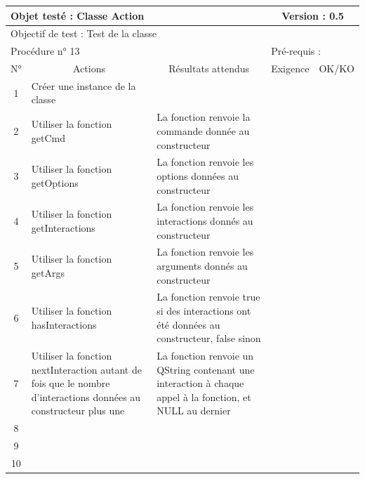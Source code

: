 \documentclass{../res/univ-projet}
\begin{document}
\begin{center}
	
    \begin{tabular}{|c|p{5cm}|p{5cm}|p{1.5cm}|p{1.5cm}|}
      \hline
      \multicolumn{3}{|l|}{Objet testé : Classe Action} & \multicolumn{2}{c|}{Version : 0.5}\\ \hline
      \multicolumn{5}{|l|}{Objectif de test : Test de la classe}\\ \hline
      \multicolumn{3}{|l|}{Procédure n° 13} & \multicolumn{2}{p{3cm}|}{Pré-requis : }\\ \hline
      \multicolumn{1}{|c|}{N°} & \multicolumn{1}{c|}{Actions} & \multicolumn{1}{c|}{Résultats attendus} & 
      \multicolumn{1}{c|}{Exigence} & \multicolumn{1}{c|}{OK/KO}\\ \hline
      1 & Créer une instance de la classe &  &  & \\
      2 & Utiliser la fonction getCmd & La fonction renvoie la commande donnée au constructeur &  & \\
      3 & Utiliser la fonction getOptions & La fonction renvoie les options données au constructeur &  & \\
      4 & Utiliser la fonction getInteractions & La fonction renvoie les interactions donnés au constructeur &  & \\
      5 & Utiliser la fonction getArgs & La fonction renvoie les arguments donnés au constructeur &  & \\
	  6 & Utiliser la fonction hasInteractions & La fonction renvoie true si des interactions ont été données au constructeur, false sinon &  & \\
      7 & Utiliser la fonction nextInteraction autant de fois que le nombre d'interactions données au constructeur plus une & La fonction renvoie un QString contenant une interaction à chaque appel à la fonction, et NULL au dernier &  & \\
      8 &  &  &  & \\
      9 &  &  &  & \\
      10 &  &  &  &\\ 
	\hline
    \end{tabular}
    \vskip 2.2cm
	

\end{center}
\end{document}
